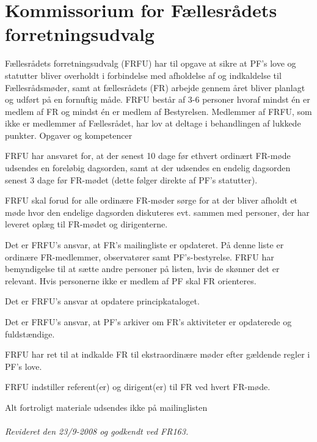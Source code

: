 \section{Kommissorium for Fællesrådets forretningsudvalg}
Fællesrådets forretningsudvalg (FRFU) har til opgave at sikre at PF’s love og statutter bliver overholdt i forbindelse
med afholdelse af og indkaldelse til Fællesrådsmøder, samt at fællesrådets (FR) arbejde gennem året bliver planlagt og
udført på en fornuftig måde. FRFU består af 3-6 personer hvoraf mindst én er medlem af FR og mindst én er medlem af
Bestyrelsen. Medlemmer af FRFU, som ikke er medlemmer af Fællesrådet, har lov at deltage i behandlingen af lukkede
punkter.
Opgaver og kompetencer
\begin{list}{•}
\item FRFU har ansvaret for, at der senest 10 dage før ethvert ordinært FR-møde udsendes en foreløbig dagsorden, samt at der udsendes en endelig dagsorden senest 3 dage før FR-mødet (dette følger direkte af PF’s statutter).
\item FRFU skal forud for alle ordinære FR-møder sørge for at der bliver afholdt et møde hvor den endelige
dagsorden diskuteres evt. sammen med personer, der har leveret oplæg til FR-mødet og dirigenterne.
\item Det er FRFU’s ansvar, at FR’s mailingliste er opdateret. På denne liste er ordinære FR-medlemmer,
observatører samt PF’s-bestyrelse. FRFU har bemyndigelse til at sætte andre personer på listen, hvis de
skønner det er relevant. Hvis personerne ikke er medlem af PF skal FR orienteres.
\item Det er FRFU’s ansvar at opdatere principkataloget.
\item Det er FRFU’s ansvar, at PF’s arkiver om FR’s aktiviteter er opdaterede og fuldstændige.
\item FRFU har ret til at indkalde FR til ekstraordinære møder efter gældende regler i PF’s love.
\item FRFU indstiller referent(er) og dirigent(er) til FR ved hvert FR-møde.
\end{list}

Alt fortroligt materiale udsendes ikke på mailinglisten\\
\\

\textit{Revideret den 23/9-2008 og godkendt ved FR163.}
